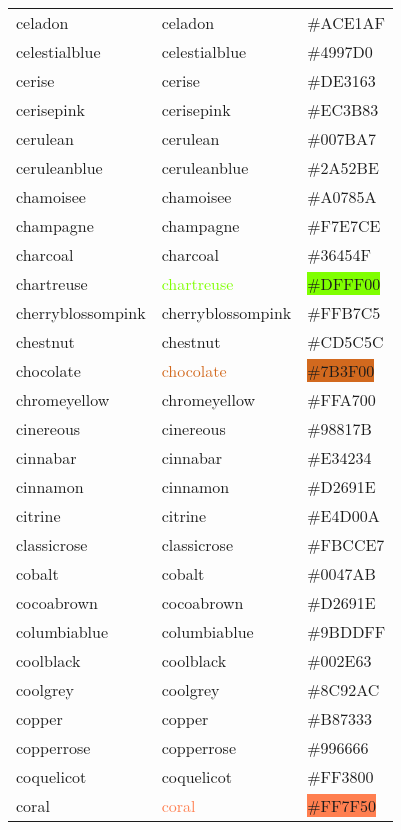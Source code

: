\documentclass[
]{article}
\begin{document}
\begin{longtable}[]{@{}lll@{}}
celadon & \textcolor{celadon}{celadon} &
\colorbox{celadon}{\#ACE1AF}\tabularnewline
celestialblue & \textcolor{celestialblue}{celestialblue} &
\colorbox{celestialblue}{\#4997D0}\tabularnewline
cerise & \textcolor{cerise}{cerise} &
\colorbox{cerise}{\#DE3163}\tabularnewline
cerisepink & \textcolor{cerisepink}{cerisepink} &
\colorbox{cerisepink}{\#EC3B83}\tabularnewline
cerulean & \textcolor{cerulean}{cerulean} &
\colorbox{cerulean}{\#007BA7}\tabularnewline
ceruleanblue & \textcolor{ceruleanblue}{ceruleanblue} &
\colorbox{ceruleanblue}{\#2A52BE}\tabularnewline
chamoisee & \textcolor{chamoisee}{chamoisee} &
\colorbox{chamoisee}{\#A0785A}\tabularnewline
champagne & \textcolor{champagne}{champagne} &
\colorbox{champagne}{\#F7E7CE}\tabularnewline
charcoal & \textcolor{charcoal}{charcoal} &
\colorbox{charcoal}{\#36454F}\tabularnewline
chartreuse & \textcolor{chartreuse}{chartreuse} &
\colorbox{chartreuse}{\#DFFF00}\tabularnewline
cherryblossompink & \textcolor{cherryblossompink}{cherryblossompink} &
\colorbox{cherryblossompink}{\#FFB7C5}\tabularnewline
chestnut & \textcolor{chestnut}{chestnut} &
\colorbox{chestnut}{\#CD5C5C}\tabularnewline
chocolate & \textcolor{chocolate}{chocolate} &
\colorbox{chocolate}{\#7B3F00}\tabularnewline
chromeyellow & \textcolor{chromeyellow}{chromeyellow} &
\colorbox{chromeyellow}{\#FFA700}\tabularnewline
cinereous & \textcolor{cinereous}{cinereous} &
\colorbox{cinereous}{\#98817B}\tabularnewline
cinnabar & \textcolor{cinnabar}{cinnabar} &
\colorbox{cinnabar}{\#E34234}\tabularnewline
cinnamon & \textcolor{cinnamon}{cinnamon} &
\colorbox{cinnamon}{\#D2691E}\tabularnewline
citrine & \textcolor{citrine}{citrine} &
\colorbox{citrine}{\#E4D00A}\tabularnewline
classicrose & \textcolor{classicrose}{classicrose} &
\colorbox{classicrose}{\#FBCCE7}\tabularnewline
cobalt & \textcolor{cobalt}{cobalt} &
\colorbox{cobalt}{\#0047AB}\tabularnewline
cocoabrown & \textcolor{cocoabrown}{cocoabrown} &
\colorbox{cinnamon}{\#D2691E}\tabularnewline
columbiablue & \textcolor{columbiablue}{columbiablue} &
\colorbox{columbiablue}{\#9BDDFF}\tabularnewline
coolblack & \textcolor{coolblack}{coolblack} &
\colorbox{coolblack}{\#002E63}\tabularnewline
coolgrey & \textcolor{coolgrey}{coolgrey} &
\colorbox{coolgrey}{\#8C92AC}\tabularnewline
copper & \textcolor{copper}{copper} &
\colorbox{copper}{\#B87333}\tabularnewline
copperrose & \textcolor{copperrose}{copperrose} &
\colorbox{copperrose}{\#996666}\tabularnewline
coquelicot & \textcolor{coquelicot}{coquelicot} &
\colorbox{coquelicot}{\#FF3800}\tabularnewline
coral & \textcolor{coral}{coral} &
\colorbox{coral}{\#FF7F50}\tabularnewline

\end{longtable}
\end{document}
